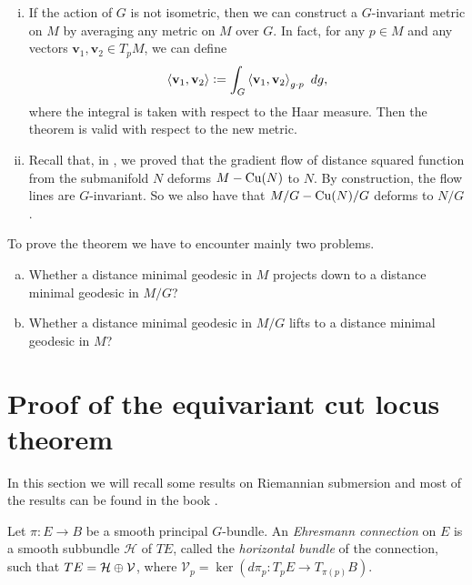 \begin{rem}
	\begin{enumerate}[(i)]
		\item If the action of $G$ is not isometric, then we can construct a $G$-invariant metric on $M$ by averaging any metric on $M$ over $G$. In fact, for any $p\in M$ and any vectors $\mathbf{v}_1,\mathbf{v}_2\in T_pM$, we can define
		\begin{displaymath}
			\left\langle \mathbf{v}_1,\mathbf{v}_2 \right\rangle \vcentcolon= \int_G \left\langle \mathbf{v}_1,\mathbf{v}_2 \right\rangle_{g\cdot p}~dg,
		\end{displaymath}
		where the integral is taken with respect to the Haar measure. Then the theorem is valid with respect to the new metric.
		\item Recall that, in , we proved that the gradient flow of distance squared function from the submanifold $N$ deforms $M-\mathrm{Cu}(N)$ to $N$. By construction, the flow lines are $G$-invariant. So we also have that $M/G-\mathrm{Cu}(N)/G$ deforms to $N/G$.
	\end{enumerate}  
\end{rem}

\vspace{0.3cm}    
\noindent To prove the theorem we have to encounter mainly two problems.
\begin{enumerate}[a.]
	\item Whether a distance minimal geodesic in $M$ projects down to a distance minimal geodesic in $M/G$?
	\item Whether a distance minimal geodesic in $M/G$ lifts to a distance minimal geodesic in $M$?
\end{enumerate}


\section{Proof of the equivariant cut locus theorem} \label{sec:Riemannian-submersion}

\hfb In this section we will recall some results on Riemannian submersion and most of the results can be found in the book \cite[Chapter V, section 26]{Mic08}.

\begin{defn}\label{defn:Ehresmann-connection}
	Let $\pi:E\to B$ be a smooth principal $G$-bundle. An \textit{Ehresmann connection} on $E$ is a smooth subbundle $\mathcal{H}$ of $TE$, called the \textit{horizontal bundle} of the connection, such that $TE=\mathcal{H}\oplus \mathcal{V}$, where $\mathcal{V}_p=\ker \left(d\pi_p:T_pE\to T_{\pi(p)}B\right)$.
\end{defn}

